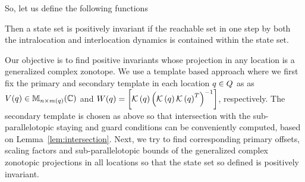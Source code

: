   So, let us define the
following functions 


Then a state set is positively invariant if the reachable set in one
step by both the intralocation and interlocation dynamics is contained
within the state set.


Our objective is to find positive invariants whose projection in any
location is a generalized complex zonotope.  We use a template based
approach where we first fix the primary and secondary template in each
location $q\in Q$ as as $V(q)\in\mathbb{M}_{n\times m(q)}(\mathbb{\mathbb{C}})$
and $W(q) = \left[\mathcal{K}\left(q\right)\left(\mathcal{K}\left(q\right)\mathcal{K}\left(q\right)^T\right)^{-1}\right]$, respectively.  The secondary
template is chosen as above so that intersection with the
sub-parallelotopic staying and guard conditions can be conveniently
computed, based on Lemma~\ref{lem:intersection}.  Next, we
try to find corresponding primary offsets, scaling factors
and sub-parallelotopic bounds of the generalized complex zonotopic
projections in all locations so that the state set so defined is
positively invariant.

